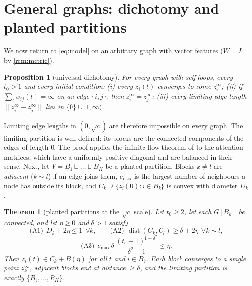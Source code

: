 \documentclass[10pt]{article}
\newtheorem{theorem}{Theorem}
\newtheorem{proposition}{Proposition}
\theoremstyle{definition}
\theoremstyle{remark}
\newcommand{\dist}{\operatorname{dist}}
\begin{document}
\section{General graphs: dichotomy and planted partitions}\label{sec:graphs}

We now return to \eqref{eq:model} on an arbitrary graph with vector features ($W=I$ by \cref{rem:metric}).

\begin{proposition}[universal dichotomy]\label{prop:dichotomy}
For every graph with self-loops, every $t_0>1$ and every initial condition: (i) every $z_i(t)$ converges to some $z_i^\infty$; (ii) if
$\sum_tw_{ij}(t)=\infty$ on an edge $\{i,j\}$, then $z_i^\infty=z_j^\infty$; (iii) every limiting edge length
$\|z_i^\infty-z_j^\infty\|$ lies in $\{0\}\cup[1,\infty)$.
\end{proposition}

Limiting edge lengths in $(0,\sqrt c)$ are therefore impossible on every graph. The limiting partition is well defined: its blocks are the
connected components of the edges of length $0$. The proof applies the infinite-flow theorem of \citet{touri2014} to the attention
matrices, which have a uniformly positive diagonal and are balanced in their sense. Next, let $V=B_1\sqcup\dots\sqcup B_K$ be a planted
partition. Blocks $k\neq l$ are \emph{adjacent} ($k\sim l$) if an edge joins them, $e_{\max}$ is the largest number of neighbours a node has
outside its block, and $C_k\supseteq\{z_i(0):i\in B_k\}$ is convex with diameter $D_k$.

\begin{theorem}[planted partitions at the $\sqrt c$ scale]\label{thm:planted}
Let $t_0\ge2$, let each $G[B_k]$ be connected, and let $\eta\ge0$ and $\delta>1$ satisfy
\[
\text{(A1)}\ \ D_k+2\eta\le1\ \ \forall k,\qquad
\text{(A2)}\ \ \dist(C_k,C_l)\ge\delta+2\eta\ \ \forall k\sim l,
\]
\[
\text{(A3)}\ \ e_{\max}\,\delta\,\frac{(t_0-1)^{1-\delta^2}}{\delta^2-1}\le\eta .
\]
Then $z_i(t)\in C_k+\bar B(\eta)$ for all $t$ and $i\in B_k$. Each block converges to a single point $z_k^\infty$, adjacent blocks end at
distance $\ge\delta$, and the limiting partition is exactly $\{B_1,\dots,B_K\}$.
\end{theorem}
\end{document}
